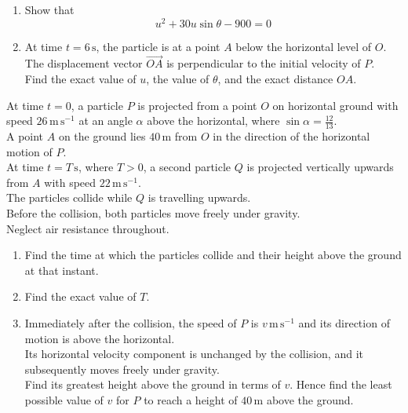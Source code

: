 \documentclass[leqno]{article}
\begin{document}
\begin{enumerate}[
  label=\textbf{\arabic*.},
  leftmargin=*,
  topsep=0pt,
  partopsep=0pt,
  parsep=0pt
]
\begin{enumerate}[label=\textbf{(\alph*)}]
\item Show that
\[
u^2+30u\sin\theta-900=0
\] 
\item At time $t=6\,\mathrm{s}$, the particle is at a point $A$ below the horizontal level of $O$. \\
The displacement vector $\overrightarrow{OA}$ is perpendicular to the initial velocity of $P$. \\
Find the exact value of $u$, the value of $\theta$, and the exact distance $OA$.  \\
\end{enumerate}

\newpage

\questionitem

At time $t=0$, a particle $P$ is projected from a point $O$ on horizontal ground with speed $26\,\mathrm{m\,s^{-1}}$ at an angle $\alpha$ above the horizontal, where $\sin\alpha=\frac{12}{13}$. \\
A point $A$ on the ground lies $40\,\mathrm{m}$ from $O$ in the direction of the horizontal motion of $P$. \\

At time $t=T\,\mathrm{s}$, where $T>0$, a second particle $Q$ is projected vertically upwards from $A$ with speed $22\,\mathrm{m\,s^{-1}}$. \\
The particles collide while $Q$ is travelling upwards. \\
Before the collision, both particles move freely under gravity. \\
Neglect air resistance throughout. \\

\begin{enumerate}[label=\textbf{(\alph*)}]
\item Find the time at which the particles collide and their height above the ground at that instant.  \\
\item Find the exact value of $T$.  \\
\item Immediately after the collision, the speed of $P$ is $v\,\mathrm{m\,s^{-1}}$ and its direction of motion is above the horizontal. \\
Its horizontal velocity component is unchanged by the collision, and it subsequently moves freely under gravity. \\
Find its greatest height above the ground in terms of $v$. Hence find the least possible value of $v$ for $P$ to reach a height of $40\,\mathrm{m}$ above the ground.  \\
\end{enumerate}


\end{enumerate}
\end{document}
